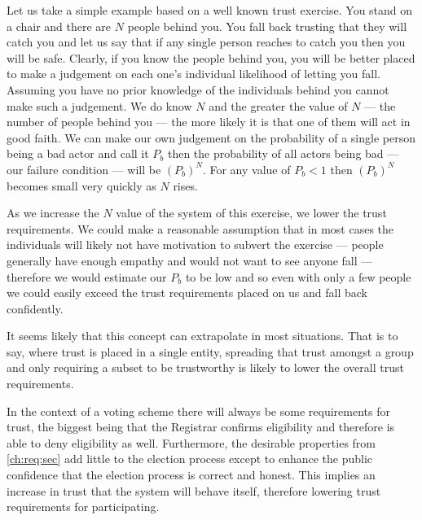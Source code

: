 Let us take a simple example based on a well known trust exercise. You stand on a chair and there are $N$ people behind you. You fall back trusting that they will catch you and let us say that if any single person reaches to catch you then you will be safe. Clearly, if you know the people behind you, you will be better placed to make a judgement on each one's individual likelihood of letting you fall. Assuming you have no prior knowledge of the individuals behind you cannot make such a judgement. We do know $N$ and the greater the value of $N$ --- the number of people behind you --- the more likely it is that one of them will act in good faith. We can make our own judgement on the probability of a single person being a bad actor and call it $P_b$ then the probability of all actors being bad --- our failure condition --- will be $(P_b)^N$. For any value of $P_b < 1$ then $(P_b)^N$ becomes small very quickly as $N$ rises.

As we increase the $N$ value of the system of this exercise, we lower the trust requirements. We could make a reasonable assumption that in most cases the individuals will likely not have motivation to subvert the exercise --- people generally have enough empathy and would not want to see anyone fall --- therefore we would estimate our $P_b$ to be low and so even with only a few people we could easily exceed the trust requirements placed on us and fall back confidently.

It seems likely that this concept can extrapolate in most situations. That is to say, where trust is placed in a single entity, spreading that trust amongst a group and only requiring a subset to be trustworthy is likely to lower the overall trust requirements.

In the context of a voting scheme there will always be some requirements for trust, the biggest being that the Registrar confirms eligibility and therefore is able to deny eligibility as well. Furthermore, the desirable properties from \autoref{ch:req:sec} add little to the election process except to enhance the public confidence that the election process is correct and honest. This implies an increase in trust that the system will behave itself, therefore lowering trust requirements for participating.